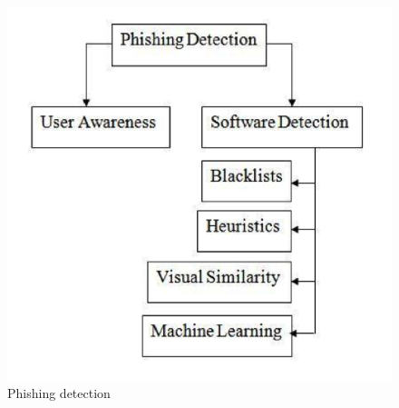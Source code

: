 \begin{figure}


\begin{centering}
\includegraphics[scale=0.8]{gfx/countermeasures}\protect\caption{\label{fig:Phishing-detection}Phishing detection\citep{parmar:2014}}

\par\end{centering}

\end{figure}


